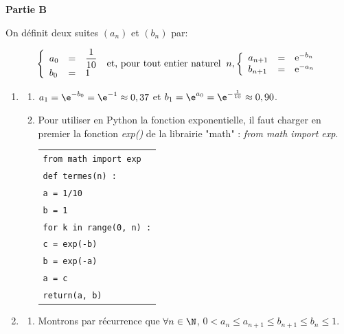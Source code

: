 \medskip

\textbf{Partie B}

\medskip

On définit deux suites $\left(a_n\right)$ et $\left(b_n\right)$ par:

\[\left\{\begin{array}{l c l}
	a_0& =& \dfrac{1}{10}\\
	b_0& =& 1
\end{array}\right.\: \text{et, pour tout entier naturel }\: n,\left\{\begin{array}{l c l}
	a_{n+1}&=&\text{e}^{-b_n}\\
	b_{n+1}&=&\text{e}^{-a_n}
\end{array}\right.\]

\begin{enumerate}
	\item 
	\begin{enumerate}
		\item $a_1=\e^{-b_0}=\e^{-1}\approx 0,37$ \quad et \quad $b_1=\e^{a_0}=\e^{-\frac{1}{10}}\approx 0,90$.
		\item Pour utiliser en Python la fonction exponentielle, il faut charger en premier la fonction \textit{exp()} de la librairie "math" : \textit{from math import exp}. 
		
		\begin{center}
			
			\begin{tabular}{|l|}\hline
				\texttt{from math import exp}\\
				\texttt{def termes(n) :}\\
				\quad \texttt{a = 1/10}\\
				\quad \texttt{b = 1}\\
				\quad \texttt{for k in range(0, n) :}\\
				\qquad \texttt{c =  exp(-b)}\\
				\qquad \texttt{b  = exp(-a)}\\
				\qquad \texttt{a  =  c}\\
				\quad \texttt{return(a, b)}\\ \hline
			\end{tabular}
		\end{center}
	\end{enumerate}
\item  

\begin{enumerate}
	\item Montrons par récurrence que $\forall n \in \N$, $0 < a_n \leqslant a_{n+1} \leqslant b_{n+1} \leqslant b_n \leqslant 1$.


\end{enumerate}
\end{enumerate}
